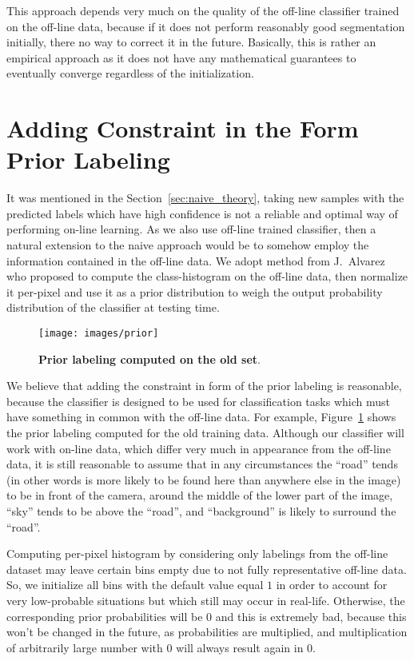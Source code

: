 This approach depends very much on the quality of the off-line classifier trained on the off-line data, because if it does not perform reasonably good
segmentation initially, there no way to correct it in the future. Basically, this is rather an empirical approach as it does not have any mathematical
guarantees to eventually converge regardless of the initialization.

\section{Adding Constraint in the Form Prior Labeling}
\label{sec:alvarez_theory}

It was mentioned in the Section~\ref{sec:naive_theory}, taking new samples with the predicted labels which have high confidence is not a reliable
and optimal way of performing on-line learning. As we also use off-line trained classifier, then a natural extension to the naive approach
would be to somehow employ the information contained in the off-line data.
We adopt method from J.~Alvarez~\etal~\cite{Alvarez2012} who proposed to compute the class-histogram on the off-line data, then normalize it 
per-pixel and use it as a prior distribution to weigh the output probability distribution of the classifier at testing time.

\begin{figure}[t]
 \centering
 \texttt{[image: images/prior]}
 \caption[Prior labeling computed on the old set]{
 {\bf Prior labeling computed on the old set}.}
 \label{fig:prior_labeling}
\end{figure}

We believe that adding the constraint in form of the prior labeling is reasonable, because the classifier is designed to be used for classification
tasks which must have something in common with the off-line data. For example, Figure~\ref{fig:prior_labeling} shows the prior labeling computed
for the old training data. Although our classifier will work with on-line data, which differ very much in appearance from the off-line data, it is still
reasonable to assume that in any circumstances the ``road'' tends (in other words is more likely to be found here than anywhere else in the image) 
to be in front of the camera, around the middle of the lower part of the image, ``sky'' tends to be above the ``road'', and ``background'' is likely to
surround the ``road''.

Computing per-pixel histogram by considering only labelings from the off-line dataset may leave certain bins empty due to not fully representative 
off-line data.
So, we initialize all bins with the default value equal $1$ in order to account for very low-probable situations but which still may occur in real-life.
Otherwise, the corresponding prior probabilities will be $0$ and this is extremely bad, because this won't be changed in the future, as probabilities 
are multiplied, and multiplication of arbitrarily large number with $0$ will always result again in $0$.

